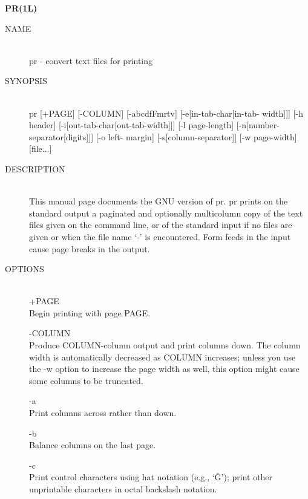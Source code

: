 
\begin{center} {\bf
PR(1L)
} \end{center}
\begin{description}


\item[NAME] \hfill \\
       pr - convert text files for printing

\item[SYNOPSIS] \hfill \\
       pr [+PAGE] [-COLUMN] [-abcdfFmrtv] [-e[in-tab-char[in-tab-
       width]]] [-h header] [-i[out-tab-char[out-tab-width]]] [-l
       page-length]   [-n[number-separator[digits]]]   [-o  left-
       margin] [-s[column-separator]] [-w page-width] [file...]

\item[DESCRIPTION] \hfill \\
       This manual page documents the  GNU  version  of  pr.   pr
       prints  on  the standard output a paginated and optionally
       multicolumn copy of the text files given  on  the  command
       line,  or  of  the standard input if no files are given or
       when the file name `-' is encountered.  Form feeds in  the
       input cause page breaks in the output.

\item[OPTIONS] \hfill \\
       +PAGE   \\
              Begin printing with page PAGE.

       -COLUMN \\
              Produce  COLUMN-column  output  and  print  columns
              down.  The column width is automatically  decreased
              as  COLUMN  increases; unless you use the -w option
              to increase the page width  as  well,  this  option
              might cause some columns to be truncated.

       -a      \\
              Print columns across rather than down.

       -b       \\
              Balance columns on the last page.

       -c      \\
              Print  control characters using hat notation (e.g.,
              `\^G'); print other unprintable characters in  octal
              backslash notation.


\end{description}
